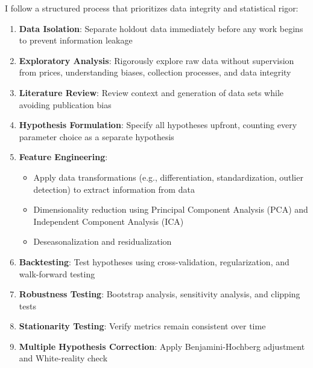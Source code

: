 \documentclass[11pt, letterpaper]{article}
\begin{document}
  I follow a structured process that prioritizes data integrity and
  statistical rigor:

  \begin{enumerate}
    \def\labelenumi{\arabic{enumi}.}

    \item \textbf{Data Isolation}: Separate holdout data immediately before
      any work begins to prevent information leakage

    \item \textbf{Exploratory Analysis}: Rigorously explore raw data without
      supervision from prices, understanding biases, collection processes,
      and data integrity

    \item \textbf{Literature Review}: Review context and generation of data
      sets while avoiding publication bias

    \item \textbf{Hypothesis Formulation}: Specify all hypotheses upfront,
      counting every parameter choice as a separate hypothesis

    \item \textbf{Feature Engineering}:

      \begin{itemize}
        \item Apply data transformations (e.g., differentiation, standardization,
          outlier detection) to extract information from data

        \item Dimensionality reduction using Principal Component Analysis
          (PCA) and Independent Component Analysis (ICA)

        \item Deseasonalization and residualization
      \end{itemize}

    \item \textbf{Backtesting}: Test hypotheses using cross-validation,
      regularization, and walk-forward testing

    \item \textbf{Robustness Testing}: Bootstrap analysis, sensitivity
      analysis, and clipping tests

    \item \textbf{Stationarity Testing}: Verify metrics remain consistent
      over time

    \item \textbf{Multiple Hypothesis Correction}: Apply Benjamini-Hochberg
      adjustment and White-reality check


\end{enumerate}
\end{document}
